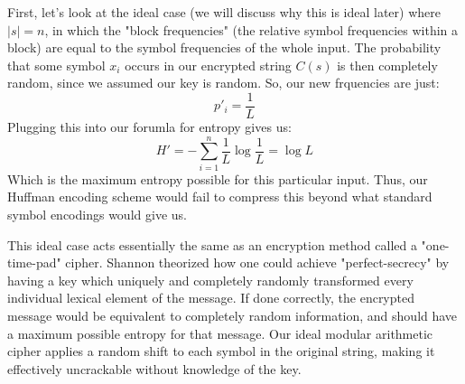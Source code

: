 \documentclass[11pt]{article}
\begin{document}
First, let's look at the ideal case (we will discuss why this is ideal later) where $|s|=n$, 
in which the "block frequencies" (the relative symbol frequencies within a block) are equal to 
the symbol frequencies of the whole input. The probability that some symbol $x_i$ occurs in 
our encrypted string $C(s)$ is then completely random, since we assumed our key is random. 
So, our new frquencies are just:
	$$p'_i=\frac{1}{L}$$
Plugging this into our forumla for entropy gives us:
	$$H'=-\sum_{i=1}^{n}\frac{1}{L}\log{\frac{1}{L}}=\log{L}$$
Which is the maximum entropy possible for this particular input. Thus, our Huffman encoding scheme 
would fail to compress this beyond what standard symbol encodings would give us.

This ideal case acts essentially the same as an encryption method called a "one-time-pad" cipher. 
Shannon theorized how one could achieve "perfect-secrecy" by having a key which uniquely and completely 
randomly transformed every individual lexical element of the message\cite{shannon-secrecy}. 
If done correctly, the encrypted message would be equivalent 
to completely random information, and should have a maximum possible entropy for that message. 
Our ideal modular arithmetic cipher applies a random shift to each symbol in the original string, making 
it effectively uncrackable without knowledge of the key.
\end{document}
